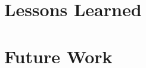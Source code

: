 \documentclass{dependencies/acm_proc_article-sp}
\begin{document}
\section{Lessons Learned}

\section{Future Work}

\newpage
%

%
%
\balancecolumns
\end{document}
